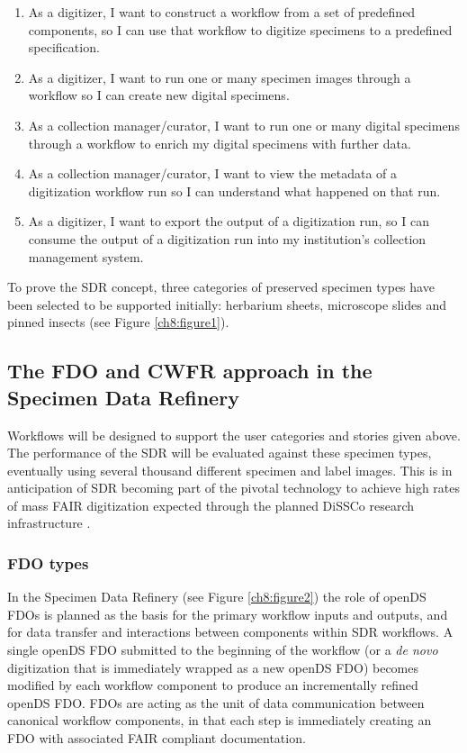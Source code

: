 \begin{enumerate}
\item
  As a digitizer, I want to construct a workflow from a set of
  predefined components, so I can use that workflow to digitize
  specimens to a predefined specification.
\item
  As a digitizer, I want to run one or many specimen images through a
  workflow so I can create new digital specimens.
\item
  As a collection manager/curator, I want to run one or many digital
  specimens through a workflow to enrich my digital specimens with
  further data.
\item
  As a collection manager/curator, I want to view the metadata of a
  digitization workflow run so I can understand what happened on that
  run.
\item
  As a digitizer, I want to export the output of a digitization run, so
  I can consume the output of a digitization run into my institution's
  collection management system.
\end{enumerate}

To prove the SDR concept, three categories of preserved specimen types
have been selected to be supported initially: herbarium sheets,
microscope slides and pinned insects (see Figure \vref{ch8:figure1}).

\subsection{The FDO and CWFR approach in the Specimen Data Refinery}\label{the-fdo-and-cwfr-approach-in-the-specimen-data-refinery}

Workflows will be designed to support the user categories and stories
given above. The performance of the SDR will be evaluated against these
specimen types, eventually using several thousand different specimen and
label images. This is in anticipation of SDR becoming part of the
pivotal technology to achieve high rates of mass FAIR digitization
expected through the planned DiSSCo research infrastructure \cite{ch8-6,ch8-5,ch8-30}.

\subsubsection{FDO types}\label{ch8:fdo-types}

In the Specimen Data Refinery (see Figure \vref{ch8:figure2}) the role of openDS FDOs is
planned as the basis for the primary workflow inputs and outputs, and
for data transfer and interactions between components within SDR
workflows. A single openDS FDO submitted to the beginning of the
workflow (or a \emph{de novo} digitization that is immediately wrapped
as a new openDS FDO) becomes modified by each workflow component to
produce an incrementally refined openDS FDO. FDOs are acting as the unit
of data communication between canonical workflow components, in that
each step is immediately creating an FDO with associated FAIR compliant
documentation.

